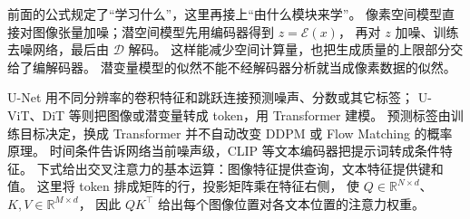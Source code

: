前面的公式规定了“学习什么”，这里再接上“由什么模块来学”。
像素空间模型直接对图像张量加噪；潜空间模型先用编码器得到 $z=\mathcal E(x)$，
再对 $z$ 加噪、训练去噪网络，最后由 $\mathcal D$ 解码。
这样能减少空间计算量，也把生成质量的上限部分交给了编解码器。
潜变量模型的似然不能不经解码器分析就当成像素数据的似然。

U-Net 用不同分辨率的卷积特征和跳跃连接预测噪声、分数或其它标签；
U-ViT、DiT 等则把图像或潜变量转成 token，用 Transformer 建模。
预测标签由训练目标决定，换成 Transformer 并不自动改变 DDPM 或 Flow Matching 的概率原理。
时间条件告诉网络当前噪声级，CLIP 等文本编码器把提示词转成条件特征。
下式给出交叉注意力的基本运算：图像特征提供查询，文本特征提供键和值。
这里将 token 排成矩阵的行，投影矩阵乘在特征右侧，
使 $Q\in\mathbb R^{N\times d}$、$K,V\in\mathbb R^{M\times d}$，
因此 $QK^\top$ 给出每个图像位置对各文本位置的注意力权重。

